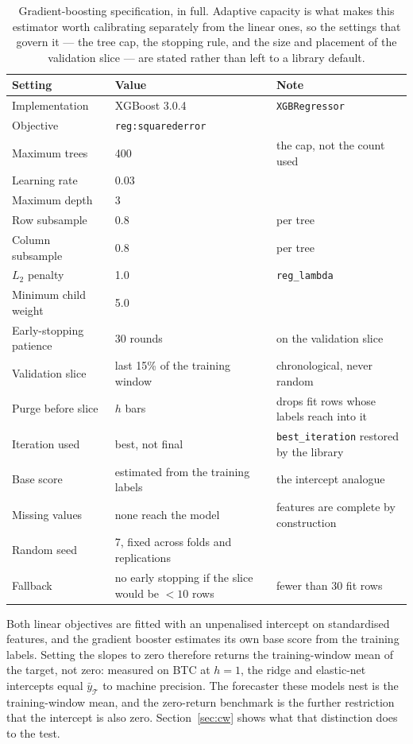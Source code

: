 \documentclass{article}
\theoremstyle{plain}
\theoremstyle{definition}
\begin{document}
\begin{table}[t]
  \centering
  \caption{Gradient-boosting specification, in full. Adaptive capacity is what makes this
  estimator worth calibrating separately from the linear ones, so the settings that govern it
  --- the tree cap, the stopping rule, and the size and placement of the validation slice ---
  are stated rather than left to a library default.}
  \label{tab:gbm}
  \small
  \begin{tabular}{lll}
    \toprule
    Setting & Value & Note \\
    \midrule
    Implementation      & XGBoost 3.0.4 \citep{chen2016} & \texttt{XGBRegressor} \\
    Objective           & \texttt{reg:squarederror} & \\
    Maximum trees       & 400 & the cap, not the count used \\
    Learning rate       & 0.03 & \\
    Maximum depth       & 3 & \\
    Row subsample       & 0.8 & per tree \\
    Column subsample    & 0.8 & per tree \\
    $L_2$ penalty       & 1.0 & \texttt{reg\_lambda} \\
    Minimum child weight& 5.0 & \\
    Early-stopping patience & 30 rounds & on the validation slice \\
    Validation slice    & last 15\% of the training window & chronological, never random \\
    Purge before slice  & $h$ bars & drops fit rows whose labels reach into it \\
    Iteration used      & best, not final & \texttt{best\_iteration} restored by the library \\
    Base score          & estimated from the training labels & the intercept analogue \\
    Missing values      & none reach the model & features are complete by construction \\
    Random seed         & 7, fixed across folds and replications & \\
    Fallback            & no early stopping if the slice would be $<10$ rows & fewer than 30 fit rows \\
    \bottomrule
  \end{tabular}
\end{table}

Both linear objectives are fitted with an unpenalised intercept on standardised
features, and the gradient booster estimates its own base score from the training
labels. Setting the slopes to zero therefore returns the training-window mean of
the target, not zero: measured on BTC at $h=1$, the ridge and elastic-net
intercepts equal $\bar y_{\mathcal{T}}$ to machine precision. The forecaster these
models nest is the training-window mean, and the zero-return benchmark is the
further restriction that the intercept is also zero. Section~\ref{sec:cw} shows
what that distinction does to the test.
\end{document}
